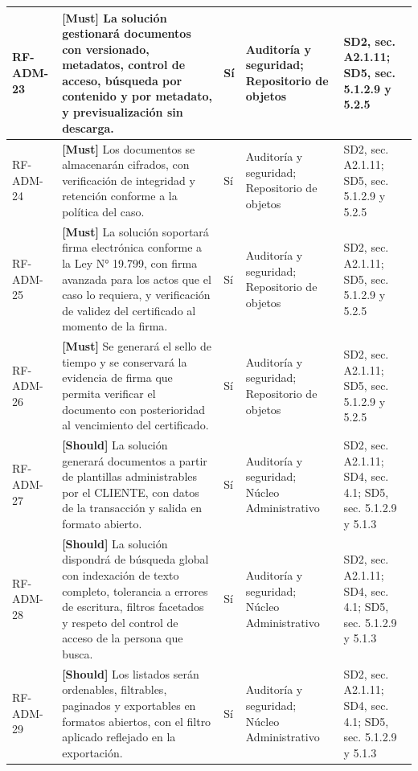 \begin{paginaHorizontalSynaptix}
\begin{longtable}{|L{0.09\AnchoMatrizTDoce}|L{0.385\AnchoMatrizTDoce}|L{0.065\AnchoMatrizTDoce}|L{0.18\AnchoMatrizTDoce}|L{0.28\AnchoMatrizTDoce}|}
RF-\allowbreak{}ADM-\allowbreak{}23 &
\textbf{[Must]} La solución gestionará documentos con versionado, metadatos, control de acceso, búsqueda por contenido y por metadato, y previsualización sin descarga. &
Sí &
Auditoría y seguridad; Repositorio de objetos &
SD2, sec. A2.1.11; SD5, sec. 5.1.2.9 y 5.2.5 \\ \hline

RF-\allowbreak{}ADM-\allowbreak{}24 &
\textbf{[Must]} Los documentos se almacenarán cifrados, con verificación de integridad y retención conforme a la política del caso. &
Sí &
Auditoría y seguridad; Repositorio de objetos &
SD2, sec. A2.1.11; SD5, sec. 5.1.2.9 y 5.2.5 \\ \hline

RF-\allowbreak{}ADM-\allowbreak{}25 &
\textbf{[Must]} La solución soportará firma electrónica conforme a la Ley N° 19.799, con firma avanzada para los actos que el caso lo requiera, y verificación de validez del certificado al momento de la firma. &
Sí &
Auditoría y seguridad; Repositorio de objetos &
SD2, sec. A2.1.11; SD5, sec. 5.1.2.9 y 5.2.5 \\ \hline

RF-\allowbreak{}ADM-\allowbreak{}26 &
\textbf{[Must]} Se generará el sello de tiempo y se conservará la evidencia de firma que permita verificar el documento con posterioridad al vencimiento del certificado. &
Sí &
Auditoría y seguridad; Repositorio de objetos &
SD2, sec. A2.1.11; SD5, sec. 5.1.2.9 y 5.2.5 \\ \hline

RF-\allowbreak{}ADM-\allowbreak{}27 &
\textbf{[Should]} La solución generará documentos a partir de plantillas administrables por el CLIENTE, con datos de la transacción y salida en formato abierto. &
Sí &
Auditoría y seguridad; Núcleo Administrativo &
SD2, sec. A2.1.11; SD4, sec. 4.1; SD5, sec. 5.1.2.9 y 5.1.3 \\ \hline

RF-\allowbreak{}ADM-\allowbreak{}28 &
\textbf{[Should]} La solución dispondrá de búsqueda global con indexación de texto completo, tolerancia a errores de escritura, filtros facetados y respeto del control de acceso de la persona que busca. &
Sí &
Auditoría y seguridad; Núcleo Administrativo &
SD2, sec. A2.1.11; SD4, sec. 4.1; SD5, sec. 5.1.2.9 y 5.1.3 \\ \hline

RF-\allowbreak{}ADM-\allowbreak{}29 &
\textbf{[Should]} Los listados serán ordenables, filtrables, paginados y exportables en formatos abiertos, con el filtro aplicado reflejado en la exportación. &
Sí &
Auditoría y seguridad; Núcleo Administrativo &
SD2, sec. A2.1.11; SD4, sec. 4.1; SD5, sec. 5.1.2.9 y 5.1.3 \\ \hline


\end{longtable}
\end{paginaHorizontalSynaptix}
